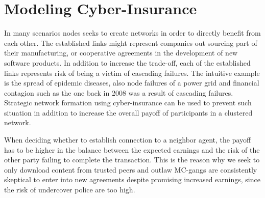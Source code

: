 \chapter{Modeling Cyber-Insurance }
\label{chp:modelingCyberInsurance} 

In many scenarios nodes seeks to create networks in order to directly benefit from each other. The established links might represent companies out sourcing part of their manufacturing, or cooperative agreements in the development of new software products. In addition to increase the trade-off, each of the established links represents risk of being a victim of cascading failures. The intuitive example is the spread of epidemic diseases, also node failures of a power grid and financial contagion such as the one back in 2008 was a result of cascading failures. Strategic network formation using cyber-insurance can be used to prevent such situation in addition to increase the overall payoff of participants in a clustered network.

When deciding whether to establish connection to a neighbor agent, the payoff has to be higher in the balance between the expected earnings and the risk of the other party failing to complete the transaction. This is the reason why we seek to only download content from trusted peers and outlaw MC-gangs are consistently skeptical to enter into new agreements despite promising increased earnings, since the risk of undercover police are too high. 

